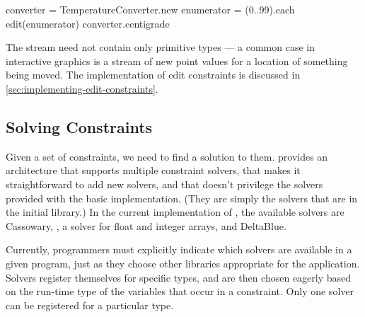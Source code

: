 \begin{code}
converter = TemperatureConverter.new
enumerator = (0..99).each
edit(enumerator) {converter.centigrade}
\end{code}

The stream need not contain only primitive types --- a common case in
interactive graphics is a stream of new point values for a location of
something being moved.  The implementation of edit constraints is
discussed in \autoref{sec:implementing-edit-constraints}.

\subsection{Solving Constraints}
\label{sec:solvers}
Given a set of constraints, we need to find a solution to them.
\langname provides an architecture that supports multiple constraint
solvers, that makes it straightforward to add new solvers, and that
doesn't privilege the solvers provided with the basic implementation.
(They are simply the solvers that are in the initial library.)  In the
current implementation of \toolname, the available solvers are
Cassowary, \zthree, a solver for float and integer arrays, and
DeltaBlue.

Currently, programmers must explicitly indicate which solvers are
available in a given program, just as they choose other libraries
appropriate for the application. Solvers register themselves for
specific types, and are then chosen eagerly based on the run-time type
of the variables that occur in a constraint.  Only one solver can
be registered for a particular type. 

